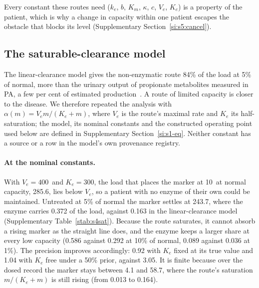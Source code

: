 Every constant these routes need ($k_e$, $b$, $K_m$, $\kappa$, $c$, $V_e$, $K_e$) is a property
of the patient, which is why a change in capacity within one patient escapes the obstacle that
blocks its level (Supplementary Section~\ref{si:s5:cancel}).

\subsection{The saturable-clearance model}
\label{si:s4:sat}

The linear-clearance model gives the non-enzymatic route 84\% of the load at 5\% of normal, more
than the urinary output of propionate metabolites measured in PA, a few per cent of estimated
production~\cite{thompson1990fasting}. A route of limited capacity is closer to the disease. We
therefore repeated the analysis with $\alpha(m)=V_em/(K_e+m)$, where $V_e$ is the route's maximal
rate and $K_e$ its half-saturation; the model, its nominal constants and the constructed
operating point used below are defined in Supplementary Section~\ref{si:s1-eq}. Neither
constant has a source or a row in the model's own provenance registry.

\paragraph{At the nominal constants.} With $V_e=400$\um\ and $K_e=300$\uM, the load that
places the marker at 10\uM\ at normal capacity, 285.6\um, lies below $V_e$, so a patient with
no enzyme of their own could be maintained.
Untreated at 5\% of normal the marker settles at 243.7\uM, where the enzyme carries 0.372 of the load, against 0.163
in the linear-clearance model (Supplementary Table~\ref{stab:s4sat}). Because the route
saturates, it cannot absorb a rising marker as the straight line does, and the enzyme keeps a
larger share at every low capacity (0.586 against 0.292 at 10\% of normal, 0.089 against 0.036 at
1\%). The precision improves accordingly: 0.92 with $K_e$ fixed at its true value and 1.04 with
$K_e$ free under a 50\% prior, against 3.05. It is finite because over the dosed record the
marker stays between 4.1 and 58.7\uM, where the route's saturation $m/(K_e+m)$ is still rising
(from 0.013 to 0.164).

